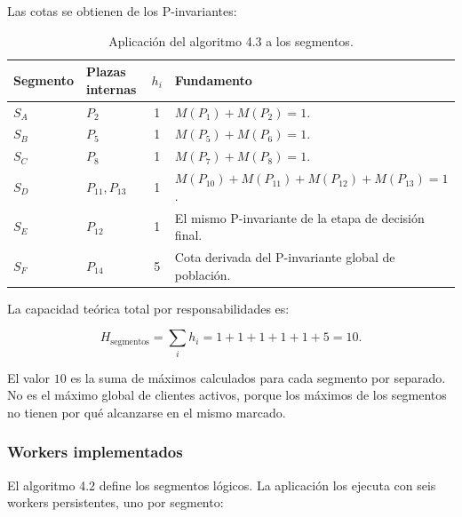\documentclass[11pt,a4paper]{article}
\begin{document}
Las cotas se obtienen de los P-invariantes:

\begin{table}[H]
    \centering
    \caption{Aplicación del algoritmo 4.3 a los segmentos.}
    \label{tab:capacidades-por-segmento}
    \small
    \begin{tabularx}{\textwidth}{@{} l l c X @{}}
        \toprule
        \textbf{Segmento} & \textbf{Plazas internas} & $h_i$ & \textbf{Fundamento} \\ \midrule
        $S_A$ & $P_2$ & 1 & $M(P_1)+M(P_2)=1$. \\
        $S_B$ & $P_5$ & 1 & $M(P_5)+M(P_6)=1$. \\
        $S_C$ & $P_8$ & 1 & $M(P_7)+M(P_8)=1$. \\
        $S_D$ & $P_{11},P_{13}$ & 1 &
        $M(P_{10})+M(P_{11})+M(P_{12})+M(P_{13})=1$. \\
        $S_E$ & $P_{12}$ & 1 &
        El mismo P-invariante de la etapa de decisión final. \\
        $S_F$ & $P_{14}$ & 5 &
        Cota derivada del P-invariante global de población. \\
        \bottomrule
    \end{tabularx}
\end{table}

La capacidad teórica total por responsabilidades es:

\begin{equation}
    H_{\mathrm{segmentos}}=\sum_i h_i=1+1+1+1+1+5=10.
\end{equation}

El valor $10$ es la suma de máximos calculados para cada segmento por
separado. No es el máximo global de clientes activos, porque los máximos de
los segmentos no tienen por qué alcanzarse en el mismo marcado.

\subsubsection{Workers implementados}

El algoritmo 4.2 define los segmentos lógicos. La aplicación los ejecuta con
seis workers persistentes, uno por segmento:
\end{document}
